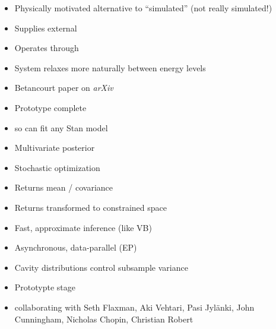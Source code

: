 \documentclass[10pt]{report}
\begin{document}
\begin{itemize}
\item Physically motivated alternative to ``simulated''
   (not really simulated!)
\item Supplies external 
\item Operates through 
\item System relaxes more naturally between energy levels
\item Betancourt paper on {\slshape arXiv}
  \vfill
\item Prototype complete
\end{itemize}


\begin{itemize}
%
\item {} so can fit any Stan model
%
\item Multivariate  posterior
%
\item Stochastic  optimization
%
\item Returns  mean / covariance
\item Returns  transformed to constrained space
\end{itemize}

\begin{itemize}
\item Fast, approximate inference (like VB)
%
\item Asynchronous, data-parallel 
  (EP)
\item Cavity distributions control subsample variance
%
\vfill
%
\item Prototypte stage
\item {\small collaborating with Seth Flaxman, Aki Vehtari, Pasi
    Jyl\"anki, John Cunningham, Nicholas Chopin, Christian Robert}
\end{itemize}
\end{document}
